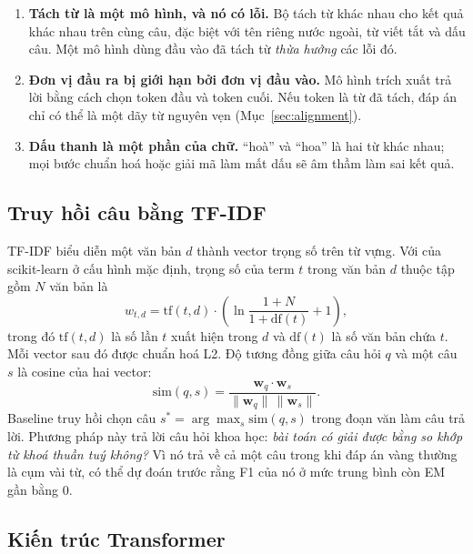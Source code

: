\begin{enumerate}
  \item \textbf{Tách từ là một mô hình, và nó có lỗi.} Bộ tách từ khác nhau cho kết quả
        khác nhau trên cùng câu, đặc biệt với tên riêng nước ngoài, từ viết tắt và dấu câu.
        Một mô hình dùng đầu vào đã tách từ \emph{thừa hưởng} các lỗi đó.
  \item \textbf{Đơn vị đầu ra bị giới hạn bởi đơn vị đầu vào.} Mô hình trích xuất trả lời
        bằng cách chọn token đầu và token cuối. Nếu token là từ đã tách, đáp án chỉ có thể
        là một dãy từ nguyên vẹn (Mục~\ref{sec:alignment}).
  \item \textbf{Dấu thanh là một phần của chữ.} ``hoà'' và ``hoa'' là hai từ khác nhau; mọi
        bước chuẩn hoá hoặc giải mã làm mất dấu sẽ âm thầm làm sai kết quả.
\end{enumerate}

\subsection{Truy hồi câu bằng TF-IDF}
\label{sec:tfidf}

TF-IDF biểu diễn một văn bản $d$ thành vector trọng số trên từ vựng. Với
 của scikit-learn \cite{pedregosa2011sklearn} ở cấu hình mặc định,
trọng số của term $t$ trong văn bản $d$ thuộc tập gồm $N$ văn bản là
\begin{equation}
  w_{t,d} = \mathrm{tf}(t,d) \cdot \left( \ln\frac{1 + N}{1 + \mathrm{df}(t)} + 1 \right),
  \label{eq:tfidf}
\end{equation}
trong đó $\mathrm{tf}(t,d)$ là số lần $t$ xuất hiện trong $d$ và $\mathrm{df}(t)$ là số
văn bản chứa $t$. Mỗi vector sau đó được chuẩn hoá L2. Độ tương đồng giữa câu hỏi $q$
và một câu $s$ là cosine của hai vector:
\begin{equation}
  \mathrm{sim}(q, s) = \frac{\mathbf{w}_q \cdot \mathbf{w}_s}{\lVert \mathbf{w}_q \rVert \, \lVert \mathbf{w}_s \rVert}.
\end{equation}
Baseline truy hồi chọn câu $s^\ast = \arg\max_s \mathrm{sim}(q, s)$ trong đoạn văn làm
câu trả lời. Phương pháp này trả lời câu hỏi khoa học: \emph{bài toán có giải được bằng
so khớp từ khoá thuần tuý không?} Vì nó trả về cả một câu trong khi đáp án vàng thường
là cụm vài từ, có thể dự đoán trước rằng F1 của nó ở mức trung bình còn EM gần bằng 0.

\subsection{Kiến trúc Transformer}

